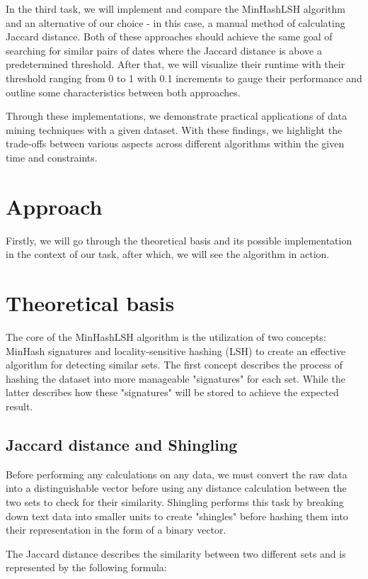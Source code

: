 \documentclass{article}
\begin{document}
In the third task, we will implement and compare the MinHashLSH algorithm and an alternative of our choice - in this case, a manual method of calculating Jaccard distance. Both of these approaches should achieve the same goal of searching for similar pairs of dates where the Jaccard distance is above a predetermined threshold. After that, we will visualize their runtime with their threshold ranging from 0 to 1 with 0.1 increments to gauge their performance and outline some characteristics between both approaches.

Through these implementations, we demonstrate practical applications of data mining techniques with a given dataset. With these findings, we highlight the trade-offs between various aspects across different algorithms within the given time and constraints.

\section{Approach}
Firstly, we will go through the theoretical basis and its possible implementation in the context of our task, after which, we will see the algorithm in action.

\section{Theoretical basis}
The core of the MinHashLSH algorithm is the utilization of two concepts: MinHash signatures and locality-sensitive hashing (LSH) to create an effective algorithm for detecting similar sets. The first concept describes the process of hashing the dataset into more manageable "signatures" for each set. While the latter describes how these "signatures" will be stored to achieve the expected result.

\subsection{Jaccard distance and Shingling}
Before performing any calculations on any data, we must convert the raw data into a distinguishable vector before using any distance calculation between the two sets to check for their similarity. Shingling performs this task by breaking down text data into smaller units to create "shingles" before hashing them into their representation in the form of a binary vector.

The Jaccard distance describes the similarity between two different sets and is represented by the following formula:
\end{document}
